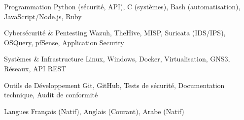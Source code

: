 
\begin{cvskills}

  \cvskill
  {Programmation} %
  {Python (sécurité, API), C (systèmes), Bash (automatisation), JavaScript/Node.js, Ruby} %

  \cvskill
  {Cybersécurité \& Pentesting} %
  {Wazuh, TheHive, MISP, Suricata (IDS/IPS), OSQuery, pfSense, Application Security} %

  \cvskill
  {Systèmes \& Infrastructure} %
  {Linux, Windows, Docker, Virtualisation, GNS3, Réseaux, API REST} %

  \cvskill
  {Outils de Développement} %
  {Git, GitHub, Tests de sécurité, Documentation technique, Audit de conformité} %

  \cvskill
  {Langues} %
  {Français (Natif), Anglais (Courant), Arabe (Natif)} %

\end{cvskills}